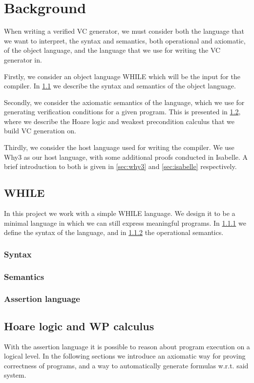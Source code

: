 \section{Background}\label{sec:background}
When writing a verified VC generator, we must consider both the language that we want to interpret, the syntax and semantics, both operational and axiomatic, of the object language, and the language that we use for writing the VC generator in.

Firstly, we consider an object language WHILE which will be the input for the compiler.
In \ref{sec:while} we describe the syntax and semantics of the object language.

Secondly, we consider the axiomatic semantics of the language, which we use for generating verification conditions for a given program. This is presented in \ref{sec:hoarewp}, where we describe the Hoare logic and weakest precondition calculus that we build VC generation on.

Thirdly, we consider the host language used for writing the compiler.
We use Why3 as our host language, with some additional proofs conducted in Isabelle. A brief introduction to both is given in \ref{sec:why3} and \ref{sec:isabelle} respectively.

\subsection{WHILE}\label{sec:while}
In this project we work with a simple WHILE language. We design it to be a minimal language in which we can still express meaningful programs.
In \ref{sec:syntax} we define the syntax of the language, and in \ref{sec:semantics} the operational semantics.

\subsubsection{Syntax}\label{sec:syntax}

\subsubsection{Semantics}\label{sec:semantics}


\subsubsection{Assertion language}\label{sec:assert}


\subsection{Hoare logic and WP calculus}\label{sec:hoarewp}
With the assertion language it is possible to reason about program execution on a logical level.
In the following sections we introduce an axiomatic way for proving correctness of programs, and a way to
automatically generate formulas w.r.t. said system.

